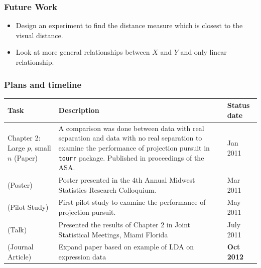 \documentclass{beamer}
\begin{document}
\begin{frame}
\frametitle{Future Work}
\begin{itemize}
\item Design an experiment to find the distance measure which is closest to the visual distance.
\item Look at more general relationships between $X$ and $Y$ and only linear relationship.
\end{itemize}
\end{frame}


\begin{frame}
\frametitle{Plans and timeline}
\begin{table}[hbtp]
\small
\centering 
\begin{tabular}{|p{3cm}|p{6cm}|l|} 
\hline
Task &  Description & Status date\\ %
\hline
Chapter 2: Large $p$, small $n$ (Paper)  & A comparison was done between data with real separation and data with no real separation to examine the performance of projection pursuit in \texttt{tourr} package. Published in proceedings of the ASA. & Jan 2011 \\
(Poster) & Poster presented in the 4th Annual Midwest Statistics Research Colloquium. & Mar 2011 \\
(Pilot Study) & First pilot study to examine the performance of projection pursuit.   & May 2011\\ 
(Talk) & Presented the results of Chapter 2 in Joint Statistical Meetings, Miami Florida  & July 2011 \\
(Journal Article) & Expand paper based on example of LDA on expression data  & {\bf Oct 2012} \\\hline
\end{tabular}
\label{tbl:tjob}
\end{table}	
\end{frame}
\end{document}
